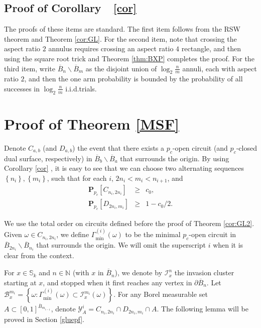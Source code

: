\documentclass[12pt, twoside,a4paper,reqno]{amsart}
\theoremstyle{plain}
\theoremstyle{remark}
\theoremstyle{definition}
\renewcommand{\bar}{\overline}
\begin{document}
\subsection{Proof of Corollary~\protect~\ref{cor}}
\label{sec:proof-coroll-prot}
The proofs of these items are standard. The first item follows from the RSW theorem and Theorem \ref{cor:GL}. For the
second item, note that crossing the aspect ratio $2$ annulus requires crossing
an aspect ratio $4$ rectangle, and then using the square root trick and Theorem \ref{thm:BXP}
completes the proof.
For the third item, write $\bar{B}_{n}\backslash \bar{B}_{m}$ as the
disjoint union of $\log _{2}\frac{n}{m}$ annuli, each with aspect ratio $2$, and
then the one arm probability is bounded by the probability of all
successes in $\log _{2}\frac{n}{m}$ i.i.d.\@ trials.



\section{Proof of Theorem \protect\ref{MSF}\label{sec:pf}}


Denote $C_{a,b}$ (and $D_{a,b}$) the event that there exists a $p_{c}$-open
circuit (and $p_{c}$-closed dual surface, respectively) in $\bar{B}%
_{b}\backslash \bar{B}_{a}$ that surrounds the origin. By using Corollary \ref{cor}%
, it is easy to see that we can choose two alternating sequences $\left\{ n_{i}\right\} ,\left\{
m_{i}\right\} $, such that for each $i$, $2n_{i}<m_{i}<n_{i+1}$, and
\begin{eqnarray}
\mathbf{P}_{p_{c}}\left[ C_{n_{i},2n_{i}}\right]  &\geq &c_{0},   \\
\mathbf{P}_{p_{c}}\left[ D_{2n_{i},m_{i}}\right]  &\geq &1-c_{0}/2.
\end{eqnarray}


We use the total order on circuits defined before the proof of Theorem \ref{cor:GL2}. Given $\omega \in C_{n_{i},2n_{i}}$, we define $\Gamma _{\min }^{\left(
i\right) }\left( \omega \right) $ to be the minimal $p_{c}$-open circuit in $%
\bar{B}_{2n_{i}}\backslash \bar{B}_{n_{i}}$ that surrounds the origin. We
will omit the superscript $i$ when it is clear from the context.

For $x\in \mathbb{S}_{k}$ and $n\in \mathbb{N}$ (with $x$ in $\bar{B}_{n}$), we denote by $\mathcal{I}_{x}^{n}$
the invasion cluster starting at $x$, and stopped when it first reaches
any vertex in $\partial \bar{B}_{n}$. Let $\mathcal{B}_{x}^{m_{i}}=\left\{
\omega :\Gamma _{\min }^{\left( i\right) }\left( \omega \right) \subset
\mathcal{I}_{x}^{m_{i}}\left( \omega \right) \right\} $. For any Borel
measurable set $A\subset \left[ 0,1\right] ^{\bar{B}_{m_{i-1}}}$, denote $%
\mathcal{Y}_{A}^{i}=C_{n_{i},2n_{i}}\cap D_{2n_{i},m_{i}}\cap A$. The
following lemma will be proved in Section \ref{gluepf}.
\end{document}
